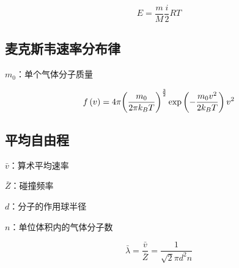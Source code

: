 \documentclass{article}
\begin{document}
\[E=\frac mM\frac i2RT\]

\subsection{麦克斯韦速率分布律}

$m_0$：单个气体分子质量

\[f\left(v\right)=4\pi{\left(\frac{m_0}{2\pi k_BT}\right)}^{\frac32}\exp\left(-\frac{m_0v^2}{2k_BT}\right)v^2\]

\subsection{平均自由程}

$\bar v$：算术平均速率

$\bar Z$：碰撞频率

$d$：分子的作用球半径

$n$：单位体积内的气体分子数

\[\bar\lambda=\frac{\bar v}{\bar Z}=\frac1{\sqrt2\pi d^2n}\]
\end{document}
